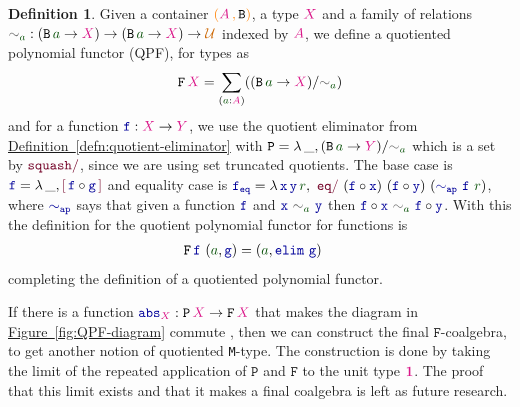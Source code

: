 \documentclass[twoside,11pt,openright]{report}
\theoremstyle{plain} %
\theoremstyle{definition}
\newtheorem{defn}[thm]{Definition}%
\theoremstyle{remark}
\newcommand*{\defref}[1]{\hyperref[defn:#1]{Definition~\ref*{defn:#1}}}
\newcommand*{\figref}[1]{\hyperref[fig:#1]{Figure~\ref*{fig:#1}}}
\newcommand*{\term}[1]{\textcolor{green!30!black}{#1}} %
\newcommand*{\type}[1]{\textcolor{magenta!90!black}{#1}}
\newcommand*{\containerpair}[2]{\ensuremath{\colorlet{savedleftcolor}{.}\color{orange}\left(\color{savedleftcolor}#1\,\textcolor{orange}{\mathbf{,}}\,#2\color{orange}\right)\color{savedleftcolor}}}
\newcommand*{\universe}[1]{\textcolor{orange!80!black}{#1}}
\newcommand*{\unit}{\type{\textbf{1}}}
\newcommand*{\relation}[1]{\textcolor{gray!75!black}{\ensuremath{\mathtt{#1}}}}
\newcommand*{\function}[1]{\textcolor{blue!60!black}{\ensuremath{\mathtt{#1}}}}
\newcommand*{\constructor}[1]{\textcolor{purple!60!black}{\ensuremath{\mathtt{#1}}}}
\newcommand*{\typeformer}[1]{\ensuremath{\mathtt{#1}}}
\newcommand*{\functor}[1]{\ensuremath{\mathbf{\mathtt{#1}}}}
\newcommand*{\quotientconstructor}[1]{\constructor{[}\,#1\,\constructor{]}}
\begin{document}
\begin{defn}
  Given a container \(\containerpair{\type{A}}{\typeformer{B}}\), a type \(\type{X}\) and a family of relations \(\relation{\sim}_{\term{a}} : (\typeformer{B}\,\term{a} \rightarrow \type{X}) \rightarrow (\typeformer{B}\,\term{a} \rightarrow \type{X}) \rightarrow \universe{\mathcal{U}}\) indexed by \(\type{A}\), we define a quotiented polynomial functor (QPF), for types as
  \begin{equation}
    \functor{F}\,\type{X} =  \sum_{(\term{a} : \type{A})} ((\typeformer{B}\,\term{a} \rightarrow \type{X}) / \relation{\sim}_{\term{a}})
  \end{equation}
  and for a function \(\function{f} : \type{X} \rightarrow \type{Y}\), we use the quotient eliminator from \defref{quotient-eliminator} with \(\typeformer{P} = \lambda\,\_, (\typeformer{B}\,\term{a} \rightarrow \type{Y})/\relation{\sim}_{\term{a}}\) which is a set by \(\constructor{squash/}\), since we are using set truncated quotients. The base case is \(\function{f} = \lambda\,\_,\quotientconstructor{\function{f} \circ \function{g}}\) and equality case is \(\function{f_{eq}} = \lambda\,\function{x}\,\function{y}\,\term{r},~\constructor{eq/}~(\function{f} \circ \function{x})~(\function{f} \circ \function{y})~(\function{\sim_{ap}}~\function{f}~\term{r})\), where \(\function{\sim_{ap}}\) says that given a function \(\function{f}\) and \(\function{x}~\relation{\sim}_{\term{a}}~\function{y}\) then \(\function{f} \circ \function{x}~\relation{\sim}_{\term{a}}~\function{f} \circ \function{y}\). With this the definition for the quotient polynomial functor for functions is
  \begin{equation}
    \begin{aligned}
      &\functor{F}\,\function{f}~(\term{a} , \function{g}) = (\term{a} , \function{elim}~\function{g})
    \end{aligned} 
  \end{equation}
  completing the definition of a quotiented polynomial functor.
\end{defn}
\noindent If there is a function \(\function{abs}_{\type{X}} : \functor{P}\,\type{X} \rightarrow \functor{F}\,\type{X}\) that makes the diagram in \figref{QPF-diagram} commute \cite{DBLP:QM-lean}, then we can construct the final \(\functor{F}\)-coalgebra, to get another notion of quotiented \texttt{M}-type. The construction is done by taking the limit of the repeated application of \(\functor{P}\) and \(\functor{F}\) to the unit type \(\unit\). The proof that this limit exists and that it makes a final coalgebra is left as future research.
\end{document}

